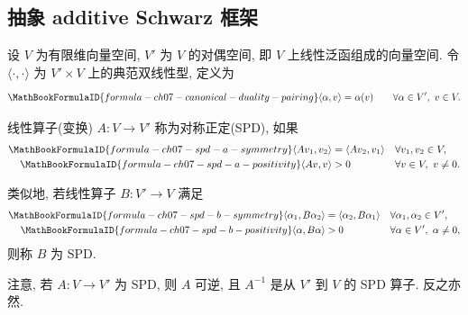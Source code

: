 \subsection{抽象 additive Schwarz 框架}
\label{sec:ch07-abstract-additive-schwarz-framework}
\setcounter{thmcount}{0}
\setcounter{equation}{0}

设 $V$ 为有限维向量空间, $V'$ 为 $V$ 的对偶空间, 即 $V$ 上线性泛函组成的向量空间. 令 $\langle\cdot,\cdot\rangle$ 为 $V'\times V$ 上的典范双线性型, 定义为
\begin{equation}
\MathBookFormulaID{formula-ch07-canonical-duality-pairing}
\label{eq:ch07-canonical-duality-pairing}
\langle\alpha,v\rangle=\alpha(v)
\qquad\forall\alpha\in V',\ v\in V.
\end{equation}

\begin{Definition}[对称正定算子]
\label{def:ch07-spd-operator-v-to-dual}
线性算子(变换) $A:V\longrightarrow V'$ 称为对称正定(SPD), 如果
\begin{align}
\MathBookFormulaID{formula-ch07-spd-a-symmetry}
\langle Av_1,v_2\rangle&=\langle Av_2,v_1\rangle
&&\forall v_1,v_2\in V,
\label{eq:ch07-spd-a-symmetry}\\
\MathBookFormulaID{formula-ch07-spd-a-positivity}
\langle Av,v\rangle&>0
&&\forall v\in V,\ v\neq0.
\label{eq:ch07-spd-a-positivity}
\end{align}
\end{Definition}

类似地, 若线性算子 $B:V'\longrightarrow V$ 满足
\begin{align}
\MathBookFormulaID{formula-ch07-spd-b-symmetry}
\langle\alpha_1,B\alpha_2\rangle&=\langle\alpha_2,B\alpha_1\rangle
&&\forall\alpha_1,\alpha_2\in V',
\label{eq:ch07-spd-b-symmetry}\\
\MathBookFormulaID{formula-ch07-spd-b-positivity}
\langle\alpha,B\alpha\rangle&>0
&&\forall\alpha\in V',\ \alpha\neq0,
\label{eq:ch07-spd-b-positivity}
\end{align}
则称 $B$ 为 SPD.

注意, 若 $A:V\longrightarrow V'$ 为 SPD, 则 $A$ 可逆, 且 $A^{-1}$ 是从 $V'$ 到 $V$ 的 SPD 算子. 反之亦然.

